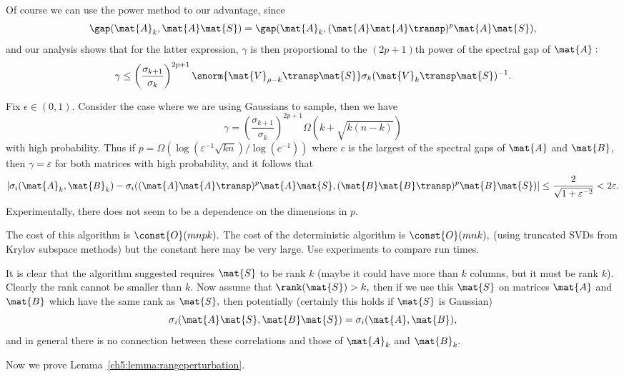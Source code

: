 \begin{remark}
Of course we can use the power method to our advantage, since
\[
\gap(\mat{A}_k, \mat{A}\mat{S}) = \gap(\mat{A}_k, (\mat{A} \mat{A}\transp)^p
\mat{A} \mat{S}),
\]
and our analysis shows that for the latter expression, $\gamma$ is then
proportional to the $(2p+1)$th power of the spectral gap of $\mat{A}:$
\[
\gamma \leq \left(\frac{\sigma_{k+1}}{\sigma_k}\right)^{2p+1}
\snorm{\mat{V}_{\rho-k}\transp\mat{S}} \sigma_k(\mat{V}_k\transp \mat{S})^{-1}.
\]

Fix $\epsilon \in (0,1).$ Consider the case where we are using Gaussians to
sample, then we have
\[
\gamma = \left(\frac{\sigma_{k+1}}{\sigma_k}\right)^{2p+1} \Omega(k +
\sqrt{k(n-k)})
\]
with high probability. Thus if $p = \Omega(\log(\varepsilon^{-1}
\sqrt{kn})/\log(c^{-1}))$ where $c$ is the largest of the spectral gaps of
$\mat{A}$ and $\mat{B}$, then $\gamma = \varepsilon$ for both matrices with high
probability, and it follows that 
\[
|\sigma_i(\mat{A}_k, \mat{B}_k) - \sigma_i((\mat{A} \mat{A}\transp)^p \mat{A}
\mat{S}, (\mat{B} \mat{B}\transp)^p \mat{B} \mat{S})| \leq
\frac{2}{\sqrt{1+\varepsilon^{-2}}} < 2\varepsilon.
\]
Experimentally, there does not seem to be a dependence on the dimensions in $p.$

The cost of this algorithm is $\const{O}(m n p k).$ The cost of the
deterministic algorithm is $\const{O}(m n k),$ (using truncated SVDs from Krylov
subspace methods) but the constant here may be very large. Use experiments to
compare run times.
\end{remark}

\begin{remark}
It is clear that the algorithm suggested requires $\mat{S}$ to be rank $k$
(maybe it could have more than $k$ columns, but it must be rank $k$). Clearly
the rank cannot be smaller than $k$. Now assume that $\rank(\mat{S}) > k,$ then
if we use this $\mat{S}$ on matrices $\mat{A}$ and $\mat{B}$ which have the same
rank as $\mat{S},$ then potentially (certainly this holds if $\mat{S}$ is
Gaussian)
\[
\sigma_i(\mat{A}\mat{S}, \mat{B}\mat{S}) = \sigma_i(\mat{A},\mat{B}), 
\]
and in general there is no connection between these correlations and those of
$\mat{A}_k$ and $\mat{B}_k.$
\end{remark}

Now we prove Lemma~\ref{ch5:lemma:rangeperturbation}.

